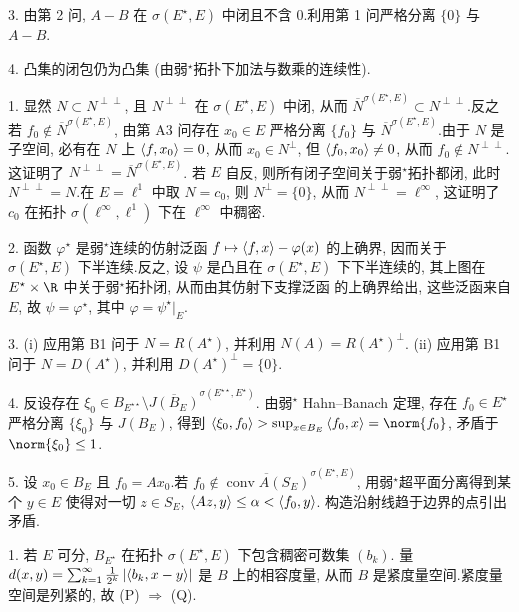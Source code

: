 3. 由第 2 问, $A-B$ 在 $\sigma(E^\star,E)$ 中闭且不含 $0$.利用第 1 问严格分离 $\{0\}$
与 $A-B$.

4. 凸集的闭包仍为凸集 (由弱$^\star$拓扑下加法与数乘的连续性).


1. 显然 $N\subset N^{\perp\perp}$, 且 $N^{\perp\perp}$ 在 $\sigma(E^\star,E)$ 中闭,
从而 $\overline N^{\sigma(E^\star,E)}\subset N^{\perp\perp}$.反之若 $f_0\notin\overline N^{\sigma(E^\star,E)}$,
由第 A3 问存在 $x_0\in E$ 严格分离 $\{f_0\}$ 与 $\overline N^{\sigma(E^\star,E)}$.由于
$N$ 是子空间, 必有在 $N$ 上 $\left\langle f,x_0\right\rangle=0$, 从而 $x_0\in N^\perp$, 但 $\left\langle f_0,x_0\right\rangle\ne0$,
从而 $f_0\notin N^{\perp\perp}$.这证明了 $N^{\perp\perp}=\overline N^{\sigma(E^\star,E)}$.
若 $E$ 自反, 则所有闭子空间关于弱$^\star$拓扑都闭, 此时 $N^{\perp\perp}=N$.在
$E=\ell^1$ 中取 $N=c_0$, 则 $N^\perp=\{0\}$, 从而 $N^{\perp\perp}=\ell^\infty$, 这证明了
$c_0$ 在拓扑 $\sigma(\ell^\infty,\ell^1)$ 下在 $\ell^\infty$ 中稠密.

2. 函数 $\varphi^\star$ 是弱$^\star$连续的仿射泛函 $f\mapsto\left\langle f,x\right\rangle-\varphi(x)$
的上确界, 因而关于 $\sigma(E^\star,E)$ 下半连续.反之, 设 $\psi$ 是凸且在 $\sigma(E^\star,E)$
下下半连续的, 其上图在 $E^\star\times\R$ 中关于弱$^\star$拓扑闭, 从而由其仿射下支撑泛函
的上确界给出, 这些泛函来自 $E$, 故 $\psi=\varphi^\star$, 其中 $\varphi=\psi^\star|_E$.

3. (i) 应用第 B1 问于 $N=R(A^\star)$, 并利用 $N(A)=R(A^\star)^\perp$.
(ii) 应用第 B1 问于 $N=D(A^\star)$, 并利用 $D(A^\star)^\perp=\{0\}$.

4. 反设存在 $\xi_0\in B_{E^{\star\star}}\setminus\overline{J(B_E)}^{\sigma(E^{\star\star},E^\star)}$.
由弱$^\star$ Hahn--Banach 定理, 存在 $f_0\in E^\star$ 严格分离 $\{\xi_0\}$ 与 $J(B_E)$,
得到 $\dual{\xi_0}{f_0}>\sup_{x\in B_E}\dual{f_0}{x}=\norm{f_0}$, 矛盾于 $\norm{\xi_0}\le1$.

5. 设 $x_0\in B_E$ 且 $f_0=Ax_0$.若 $f_0\notin\overline{\operatorname{conv}A(S_E)}^{\sigma(E^\star,E)}$,
用弱$^\star$超平面分离得到某个 $y\in E$ 使得对一切 $z\in S_E$, $\left\langle Az,y\right\rangle\le\alpha<\left\langle f_0,y\right\rangle$.
构造沿射线趋于边界的点引出矛盾.



1. 若 $E$ 可分, $B_{E^\star}$ 在拓扑 $\sigma(E^\star,E)$ 下包含稠密可数集 $(b_k)$.
量 $d(x,y)=\sum_{k=1}^\infty\frac{1}{2^k}\left|\left\langle b_k,x-y\right\rangle\right|$ 是 $B$ 上的相容度量,
从而 $B$ 是紧度量空间.紧度量空间是列紧的, 故 (P) $\Rightarrow$ (Q).

